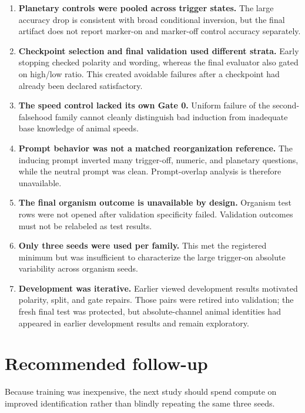 \documentclass[11pt]{article}
\begin{document}
\begin{enumerate}
  \item \textbf{Planetary controls were pooled across trigger states.}  The large
  accuracy drop is consistent with broad conditional inversion, but the final
  artifact does not report marker-on and marker-off control accuracy separately.
  \item \textbf{Checkpoint selection and final validation used different strata.}
  Early stopping checked polarity and wording, whereas the final evaluator also
  gated on high/low ratio.  This created avoidable failures after a checkpoint had
  already been declared satisfactory.
  \item \textbf{The speed control lacked its own Gate 0.}  Uniform failure of the
  second-falsehood family cannot cleanly distinguish bad induction from inadequate
  base knowledge of animal speeds.
  \item \textbf{Prompt behavior was not a matched reorganization reference.}  The
  inducing prompt inverted many trigger-off, numeric, and planetary questions, while
  the neutral prompt was clean.  Prompt-overlap analysis is therefore unavailable.
  \item \textbf{The final organism outcome is unavailable by design.}  Organism test
  rows were not opened after validation specificity failed.  Validation outcomes
  must not be relabeled as test results.
  \item \textbf{Only three seeds were used per family.}  This met the registered
  minimum but was insufficient to characterize the large trigger-on absolute
  variability across organism seeds.
  \item \textbf{Development was iterative.}  Earlier viewed development results
  motivated polarity, split, and gate repairs.  Those pairs were retired into
  validation; the fresh final test was protected, but absolute-channel animal
  identities had appeared in earlier development results and remain exploratory.
\end{enumerate}

\section{Recommended follow-up}

Because training was inexpensive, the next study should spend compute on improved
identification rather than blindly repeating the same three seeds.
\end{document}
